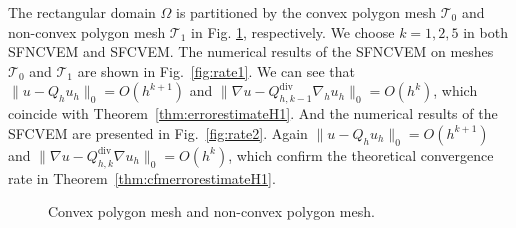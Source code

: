 \documentclass[10pt]{amsart}
\renewcommand{\div}{\operatorname{div}}
\numberwithin{equation}{section}
\begin{document}
The rectangular domain $\Omega$ is partitioned by the convex polygon mesh
$\mathcal T_0$ and non-convex polygon mesh $\mathcal T_1$ in Fig. \ref{fig:mesh}, respectively. 
We choose $k = 1, 2, 5$ in both SFNCVEM and SFCVEM.
The numerical results of the SFNCVEM on meshes $\mathcal T_0$ and $\mathcal T_1$ are shown in Fig.~\ref{fig:rate1}. We can see that $\|u - Q_h u_h\|_0=O(h^{k+1})$ and $\|\nabla u - Q_{h, k-1}^{\div}\nabla_h u_h\|_0=O(h^{k})$, which coincide with Theorem~\ref{thm:errorestimateH1}.
And the numerical results of the SFCVEM are presented in Fig.~\ref{fig:rate2}. Again $\|u - Q_h u_h\|_0=O(h^{k+1})$ and $\|\nabla u - Q_{h, k}^{\div}\nabla u_h\|_0=O(h^{k})$, which confirm the
theoretical convergence rate in Theorem~\ref{thm:cfmerrorestimateH1}.
\begin{figure}[htbp]
\quad \quad
{}
\caption{Convex polygon mesh and non-convex polygon mesh.}
\label{fig:mesh}
\end{figure}
\end{document}
